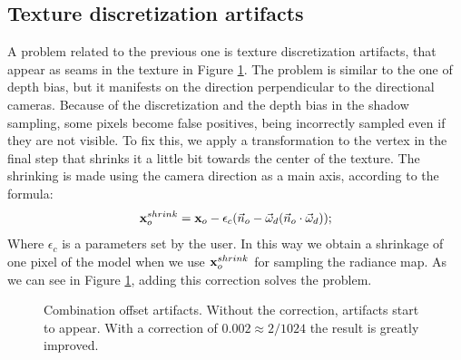 \FloatBarrier
\subsection{Texture discretization artifacts}
A problem related to the previous one is texture discretization artifacts, that appear as seams in the texture in Figure \ref{fig:combias}. The problem is similar to the one of depth bias, but it manifests on the direction perpendicular to the directional cameras. Because of the discretization and the depth bias in the shadow sampling, some pixels become false positives, being incorrectly sampled even if they are not visible. To fix this, we apply a transformation to the vertex in the final step that shrinks it a little bit towards the center of the texture. The shrinking is made using the camera direction as a main axis, according to the formula:
$$
\mathbf{x}_o^{shrink} = \mathbf{x}_o - \epsilon_c (\vec{n}_o - \vec{\omega}_d (\vec{n}_o \cdot \vec{\omega}_d));
$$
Where $\epsilon_c$ is a parameters set by the user. In this way we obtain a shrinkage of one pixel of the model when we use $\mathbf{x}_o^{shrink}$ for sampling the radiance map. As we can see in Figure \ref{fig:combias}, adding this correction solves the problem.

\begin{figure}
\centering
{}
\caption{Combination offset artifacts. Without the correction, artifacts start to appear. With a correction of $0.002 \approx 2 / 1024$ the result is greatly improved.}
\label{fig:combias}
\end{figure}


